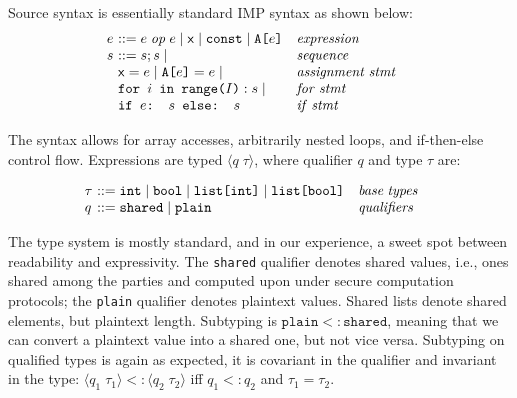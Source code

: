 Source syntax is essentially standard IMP syntax as shown below:
{\small
\[
\begin{array}{l@{~~~~~}l}
  \begin{array}{l@{~}l@{~~~}l}
 e & ::= e \; \mathit{op} \; e \mid \x \mid  \texttt{const} \mid \texttt{A[$e$]} & \mathit{expression} \\
  s & ::= s;s \mid  & \mathit{sequence} \\
  & \x = e \mid \texttt{A[$e$]} = e \mid & \mathit{assignment \; stmt} \\
  & \texttt{for $i$ in range($I$)}: s \mid & \mathit{for \; stmt} \\
  & \texttt{if $e$: $s$ else: $s$} & \mathit{if \; stmt} \\

  \end{array}
\end{array}
\]
}

The syntax allows for array accesses, arbitrarily nested loops, and if-then-else control flow.
Expressions are typed $\langle q \; \tau\rangle$, where qualifier $q$ and type $\tau$ are:

{\small
\[
\begin{array}{l@{~~~~~}l}
  \begin{array}{l@{~}l@{~~~}l}
 \tau & ::= \texttt{int}  \mid \texttt{bool} \mid \texttt{list[int]} \mid  \texttt{list[bool]} & \mathit{base \; types} \\
  q & ::= \texttt{shared} \mid \texttt{plain} & \mathit{qualifiers} \\
  \end{array}
\end{array}
\]
}

The type system is mostly standard, and in our experience, a sweet spot between readability and expressivity.
The \texttt{shared} qualifier denotes shared values, i.e., ones shared among the parties and computed upon
under secure computation protocols; the \texttt{plain} qualifier denotes plaintext values.
Shared lists denote shared elements, but plaintext length. Subtyping is
$\texttt{plain} <: \texttt{shared}$, meaning that we can convert a plaintext value into a shared one,
but not vice versa. Subtyping on qualified types is again as expected, it is covariant in the qualifier
and invariant in the type: $\langle q_1 \; \tau_1 \rangle <: \langle q_2 \; \tau_2 \rangle$
iff $q_1 <: q_2$ and  $\tau_1 = \tau_2$.

